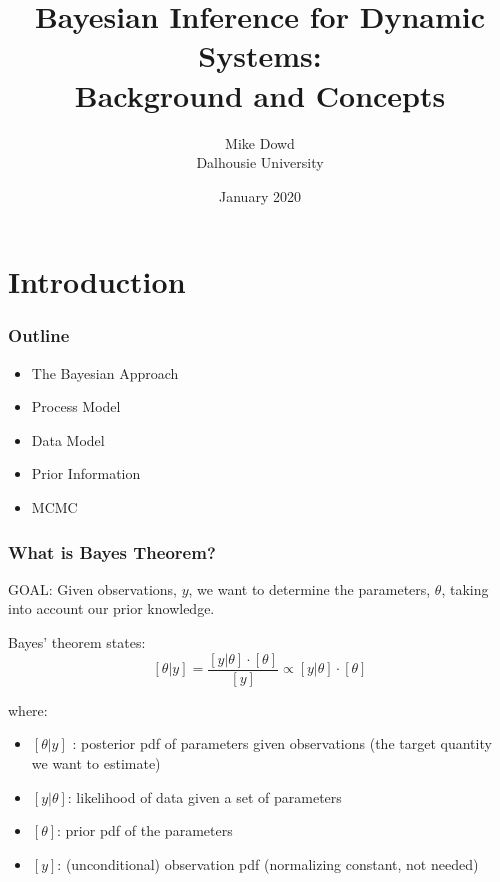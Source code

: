 \documentclass{beamer}
\title{Bayesian Inference for Dynamic Systems: \\
Background and Concepts}
\author{Mike Dowd \\ Dalhousie University}
\date{January 2020}
\begin{document}
\section{Introduction}
\frame{\titlepage}


\frame%
  {\frametitle{Outline}

  

\begin{itemize}
\item The Bayesian Approach
\item Process Model
\item Data Model
\item Prior Information
\item MCMC
\end{itemize}
}


\frame%
{\frametitle{What is Bayes Theorem?}

\medskip
GOAL: Given observations, $y$, we want to determine the parameters, $\theta$, taking into account our prior knowledge.

\medskip
Bayes' theorem states: 
\[
[\theta | y] =\frac{ [ y | \theta ] \cdot [\theta]}{[y]} \propto [ y | \theta ] \cdot [\theta]
\]

where:
\begin{itemize}
\item
$[\theta | y]$ : posterior pdf of parameters given observations (the target quantity we want to estimate)
\item
$[y | \theta]$: likelihood of data given a set of parameters 
\item
$[\theta]$: prior pdf of the parameters
\item
$[y]$: (unconditional) observation pdf (normalizing constant, not needed)

\end{itemize}


}
\end{document}
